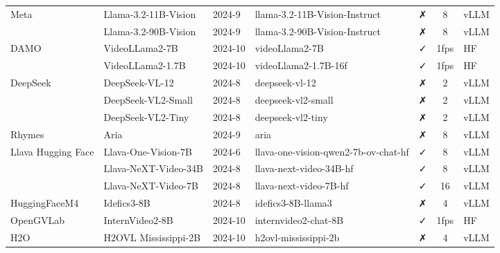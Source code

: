 \documentclass{article}
\begin{document}
\begin{longtable}{l l l l c c l}
    Meta & Llama-3.2-11B-Vision & 2024-9 & llama-3.2-11B-Vision-Instruct & ✗ & 8 & vLLM \\
    & Llama-3.2-90B-Vision & 2024-9 & llama-3.2-90B-Vision-Instruct & ✗ & 8 & vLLM \\
    DAMO & VideoLLama2-7B & 2024-10 & videoLlama2-7B & ✓ & 1fps & HF \\
    & VideoLLama2-1.7B & 2024-10 & videoLlama2-1.7B-16f & ✓ & 1fps & HF \\
    DeepSeek & DeepSeek-VL-12 & 2024-8 & deepseek-vl-12 & ✗ & 2 & vLLM \\
    & DeepSeek-VL2-Small & 2024-8 & deepseek-vl2-small & ✗ & 2 & vLLM \\
    & DeepSeek-VL2-Tiny & 2024-8 & deepseek-vl2-tiny & ✗ & 2 & vLLM \\
    Rhymes & Aria & 2024-9 & aria & ✗ & 8 & vLLM \\
    Llava Hugging Face & Llava-One-Vision-7B & 2024-6 & llava-one-vision-qwen2-7b-ov-chat-hf & ✓ & 8 & vLLM \\
    & Llava-NeXT-Video-34B & 2024-8 & llava-next-video-34B-hf & ✓ & 8 & vLLM \\
    & Llava-NeXT-Video-7B & 2024-8 & llava-next-video-7B-hf & ✓ & 16 & vLLM \\
    HuggingFaceM4 & Idefics3-8B & 2024-8 & idefics3-8B-llama3 & ✗ & 4 & vLLM \\
    OpenGVLab & InternVideo2-8B & 2024-10 & internvideo2-chat-8B & ✓ & 1fps & HF \\
    H2O & H2OVL Mississippi-2B & 2024-10 & h2ovl-mississippi-2b & ✗ & 4 & vLLM \\
    \bottomrule
\end{longtable}
\end{document}
